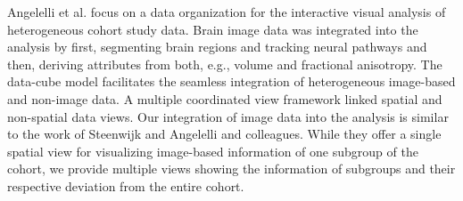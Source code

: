 \documentclass[journal]{style/vgtc} 			          %
\newcommand{\rem}[1]{\textcolor{red}{\sout{#1}}}
\begin{document}
Angelelli et al. \cite{Angelelli2014} focus on a data organization for the interactive visual analysis of heterogeneous cohort study data.
%
%
Brain image data was integrated into the analysis by first, segmenting brain regions and tracking neural pathways and then, deriving attributes from both, e.g., volume and fractional anisotropy.
%
The data-cube model facilitates the seamless integration of heterogeneous image-based and non-image data.
%
A multiple coordinated view framework linked spatial and non-spatial data views.
%
%
Our integration of image data into the analysis is similar to the work of Steenwijk \cite{Steenwijk2010} and Angelelli \cite{Angelelli2014} and colleagues.
%
While they offer a single spatial view for visualizing image-based information of one subgroup of the cohort, we provide multiple views showing the information of subgroups and their respective deviation from the entire cohort.
%
\end{document}

